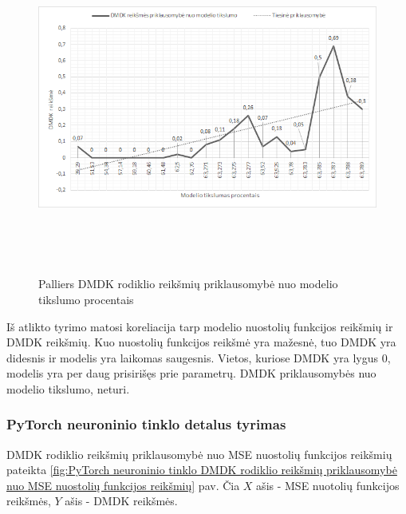 \documentclass{VUMIFInfBakalaurinis}
\begin{document}
\begin{figure}[h]
  \centering
  \includegraphics[width=14cm,height=11cm,keepaspectratio]{img/pal_tyr_2.png}
  \caption{Palliers DMDK rodiklio reikšmių priklausomybė nuo modelio tikslumo procentais}
  \label{fig:Palliers DMDK rodiklio reikšmių priklausomybė nuo modelio tikslumo procentais}
\end{figure}

\par Iš atlikto tyrimo matosi koreliacija tarp modelio nuostolių funkcijos reikšmių ir DMDK reikšmių. Kuo nuostolių funkcijos reikšmė yra mažesnė, tuo DMDK yra didesnis ir modelis yra laikomas saugesnis. Vietos, kuriose DMDK yra lygus 0, modelis yra per daug prisirišęs prie parametrų. DMDK priklausomybės nuo modelio tikslumo, neturi.

\subsubsection{PyTorch neuroninio tinklo detalus tyrimas}
\par DMDK rodiklio reikšmių priklausomybė nuo MSE nuostolių funkcijos reikšmių pateikta \ref{fig:PyTorch neuroninio tinklo DMDK rodiklio reikšmių priklausomybė nuo MSE nuostolių funkcijos reikšmių} pav. Čia $X$ ašis - MSE nuotolių funkcijos reikšmės, $Y$ ašis - DMDK reikšmės. 
\end{document}
